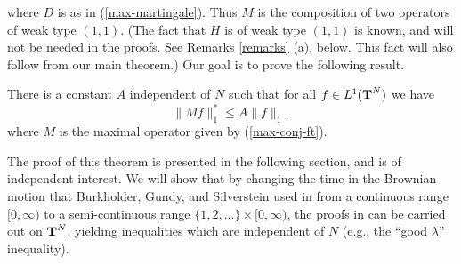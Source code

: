 where $D$ is as in (\ref{max-martingale}).  
Thus $M$ is the composition of two operators of weak type
$(1,1)$.  (The fact that $H$ is of weak type $(1,1)$
is known, and will not be needed in the proofs.  See 
Remarks \ref{remarks} (a), below.  This fact will also follow 
from our main theorem.)
Our goal is to
prove the following result.  
\begin{maintheorem}
There is a constant $A$ independent of $N$ such that
for all $f\in L^1(\T^N)$ we have
\begin{equation}
\|Mf\|^*_1\leq A \|f\|_1,
\label{desired-inequality}
\end{equation}
where $M$ is the maximal operator given by 
(\ref{max-conj-ft}).
\label{maintheorem}
\end{maintheorem}
The proof of this theorem is presented in the following section,
and is of independent interest.
We will show that by changing the 
time in the Brownian motion that Burkholder, Gundy, and Silverstein
used in \cite{bgs} from a continuous range $[0,\infty)$
to a semi-continuous range $\{1,2,\ldots\}\times [0,\infty)$,
the proofs in \cite{bgs} can be carried out
on $\T^N$,
yielding inequalities which are independent of $N$
(e.g., the ``good $\lambda$'' inequality).

